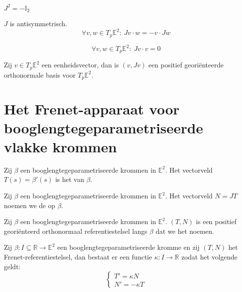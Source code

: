 \documentclass[main.tex]{subfiles}
\begin{document}
\begin{st}
  $J^{2} = -\mathbb{I}_{2}$
\end{st}

\begin{st}
  $J$ is antisymmetrisch.
  \[ \forall v,w \in T_{p}\mathbb{E}^{2}:\ Jv\cdot w = -v \cdot Jw \]
\end{st}

\begin{st}
  \[ \forall v,w \in T_{p}\mathbb{E}^{2}:\ Jv\cdot v = 0 \]
\end{st}

\begin{st}
  Zij $v\in T_{p}\mathbb{E}^{2}$ een eenheidsvector, dan is $(v,Jv)$ een positief geori\"enteerde orthonormale basis voor $T_{p}\mathbb{E}^{2}$.
\end{st}

\section{Het Frenet-apparaat voor booglengtegeparametriseerde vlakke krommen}
\label{sec:het-frenet-apparaat}

\begin{de}
  Zij $\beta$ een booglengtegeparametriseerde krommen in $\mathbb{E}^{2}$.
  Het vectorveld $T(s) = \beta'(s)$ is het  van $\beta$.
\end{de}

\begin{de}
  Zij $\beta$ een booglengtegeparametriseerde krommen in $\mathbb{E}^{2}$.
  Het vectorveld $N = JT$ noemen we de  op $\beta$.
\end{de}

\begin{de}
  Zij $\beta$ een booglengtegeparametriseerde krommen in $\mathbb{E}^{2}$.
  $(T,N)$ is een positief geori\"enteerd orthonormaal referentiestelsel langs $\beta$ dat we het  noemen.
\end{de}

\begin{st}
  Zij $\beta: I \subseteq \mathbb{R} \rightarrow \mathbb{E}^{2}$ een booglengtegeparametriseerde kromme en zij $(T,N)$ het Frenet-referentiestelsel, dan bestaat er een functie $\kappa: I \rightarrow \mathbb{R}$ zodat het volgende geldt:
  \[ 
  \left\{
    \begin{array}{cl}
      T' = \kappa N\\
      N' = -\kappa T
    \end{array}
  \right.
  \]
\end{st}
\end{document}
